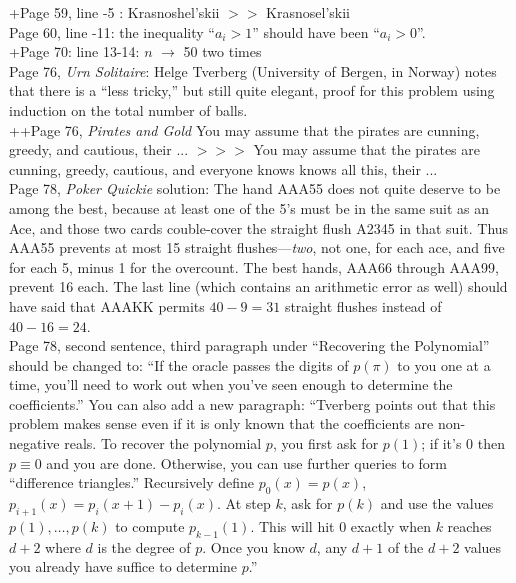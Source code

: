 \documentclass[11pt]{article}
\begin{document}
+Page 59, line -5 :  Krasnoshel'skii $>>$ Krasnosel'skii \\

Page 60, line -11: the inequality ``$a_i>1$'' should have been ``$a_i>0$''.\\

+Page 70: line 13-14: $n$ $\to$ 50 two times\\ 

Page 76, {\em Urn Solitaire}: Helge Tverberg (University of Bergen, in Norway) notes
that there is a ``less tricky,'' but still quite elegant, proof for this problem using
induction on the total number of balls.\\

++Page 76, {\em Pirates and Gold}
You may assume that the pirates are cunning, greedy, and cautious, their ...
$>>>$
You may assume that the pirates are cunning, greedy, cautious, and everyone knows knows all this, their ...
\\

Page 78, {\em Poker Quickie} solution:  The hand AAA55 does not quite deserve to be among
the best, because at least one of the 5's must be in the same suit as an Ace, and those two cards
couble-cover the straight flush A2345 in that suit.  Thus AAA55 prevents at most 15 straight
flushes---{\em two}, not one, for each ace, and five for each 5, minus 1 for the overcount.
The best hands, AAA66 through AAA99, prevent 16 each.  The last line (which contains an arithmetic
error as well) should have said that AAAKK permits $40 - 9 = 31$ straight flushes instead of $40 - 16 = 24$. \\

Page 78, second sentence, third paragraph under ``Recovering the Polynomial'' should be changed to:
``If the oracle passes the digits of $p(\pi)$ to you one at a time, you'll need to work out when
you've seen enough to determine the coefficients.''  You can also add a new paragraph:
``Tverberg points out that this
problem makes sense even if it is only known that the coefficients are non-negative
reals.  To recover the polynomial $p$, you first ask for $p(1)$; if it's 0 then
$p \equiv 0$ and you are done.  Otherwise, you can use further queries to
form ``difference triangles.''  Recursively define $p_0(x) = p(x)$, $p_{i+1}(x) =
p_i(x{+}1)-p_i(x)$.  At step $k$, ask for $p(k)$ and use the values $p(1),\dots,p(k)$
to compute $p_{k-1}(1)$.  This will hit 0 exactly when $k$ reaches $d{+}2$ where $d$ is the degree
of $p$. Once you know $d$, any $d{+}1$ of the $d{+}2$ values you already have suffice to
determine $p$.''\\
\end{document}
